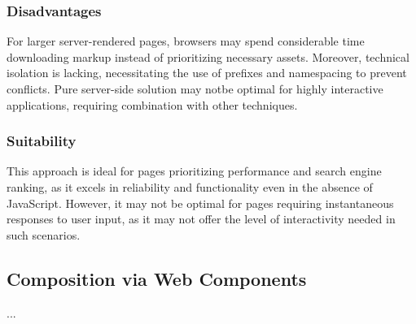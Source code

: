 \subsubsection{Disadvantages}
For larger server-rendered pages, browsers may spend considerable time downloading markup instead of prioritizing necessary assets. Moreover, technical isolation is lacking, necessitating the use of prefixes and namespacing to prevent conflicts. Pure server-side solution may notbe optimal for highly interactive applications, requiring combination with other techniques. \cite{MFInAction}

\subsubsection{Suitability}
This approach is ideal for pages prioritizing performance and search engine ranking, as it excels in reliability and functionality even in the absence of JavaScript. However, it may not be optimal for pages requiring instantaneous responses to user input, as it may not offer the level of interactivity needed in such scenarios. \cite{MFInAction}

\subsection{Composition via Web Components}
...